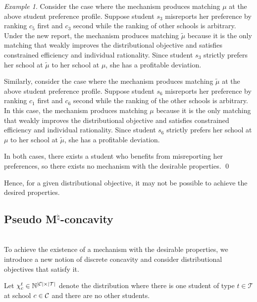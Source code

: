 \documentclass[12pt]{amsart}
\theoremstyle{remark}
\newtheorem{example}{Example}
\def\T{\mathcal{T}} \def\calt{\mathcal{T}}
\begin{document}
\begin{example}
Consider the case where the mechanism produces matching $\mu$ at the above student preference profile. Suppose student $s_3$ misreports her preference by ranking $c_5$ first and $c_3$ second while the ranking of other schools is arbitrary. Under the new report, the mechanism produces matching $\tilde \mu$ because it is the only matching that weakly improves the distributional objective and satisfies constrained efficiency and individual rationality. Since student $s_3$ strictly prefers her school at $\tilde \mu$ to her school at $\mu$, she has a profitable deviation.

Similarly, consider the case where the mechanism produces matching $\tilde \mu$ at the above student preference profile. Suppose student $s_6$ misreports her preference by ranking $c_1$ first and $c_6$ second while the ranking of the other schools is arbitrary. In this case, the mechanism produces matching $\mu$ because it is the only matching that weakly improves the distributional objective
and satisfies constrained efficiency and individual rationality. Since student $s_6$ strictly prefers her school at $\mu$ to her school at $\tilde \mu$, she has a profitable deviation.

In both cases, there exists a student who benefits from misreporting her preferences, so there exists no mechanism with the desirable properties.
\qed
\end{example}

Hence, for a given distributional objective, it may not be possible to achieve the desired properties.


\subsection{Pseudo M$^{\natural}$-concavity}\hfill\\
To achieve the existence of a mechanism with the desirable properties, we introduce a new notion of discrete
concavity and consider distributional objectives that satisfy it.

Let $\chi_c^t \in \mathbb N^{|\C|\times |\T|}$ denote
the distribution where there is one student of type $t\in \mathcal{T}$ at school $c\in \mathcal{C}$ and there are no other students.
\end{document}
